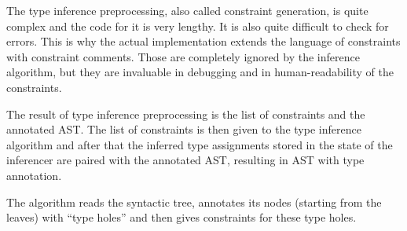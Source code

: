 The type inference preprocessing, also called constraint generation, is quite complex and the code for it is very lengthy. It is also quite difficult to check for errors. This is why the actual implementation extends the language of constraints with constraint comments. Those are completely ignored by the inference algorithm, but they are invaluable in debugging and in human-readability of the constraints.

The result of type inference preprocessing is the list of constraints and the annotated AST. The list of constraints is then given to the type inference algorithm and after that the inferred type assignments stored in the state of the inferencer are paired with the annotated AST, resulting in AST with type annotation.


The algorithm reads the syntactic tree, annotates its nodes (starting from the leaves) with ``type holes'' and then gives constraints for these type holes.


